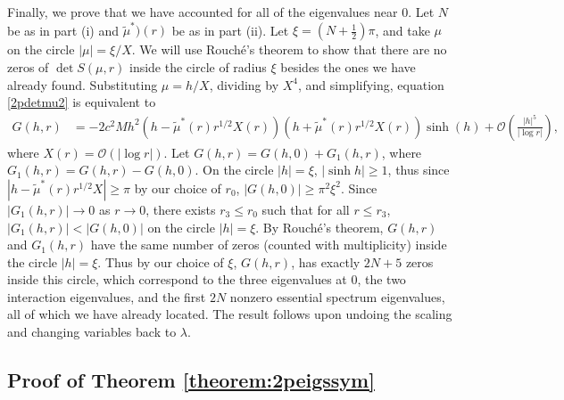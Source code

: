 \documentclass[10pt,reqno]{amsart}
\theoremstyle{plain}
\theoremstyle{definition}
\theoremstyle{remark}
\numberwithin{theorem}{section}
\numberwithin{equation}{section}
\begin{document}
Finally, we prove that we have accounted for all of the eigenvalues near 0. Let $N$ be as in part (i) and $\tilde{\mu}^*)(r)$ be as in part (ii). Let $\xi = \left( N + \frac{1}{2} \right) \pi$, and take $\mu$ on the circle $|\mu| = \xi/X$. We will use Rouch\'{e}'s theorem to show that there are no zeros of $\det S(\mu, r)$ inside the circle of radius $\xi$ besides the ones we have already found. Substituting $\mu = h/X$, dividing by $X^4$, and simplifying, equation \cref{2pdetmu2} is equivalent to 
\begin{equation}\label{Gcount3}
\begin{aligned}
G(h,r) &= -2 c^2 M h^2 \left( h - \tilde{\mu}^*(r)r^{1/2}X(r) \right)\left(h + \tilde{\mu}^*(r)r^{1/2}X(r) \right) \sinh(h) + \mathcal{O}\left(\frac{|h|^5}{|\log r| }\right),
\end{aligned}
\end{equation}
where $X(r) = \mathcal{O}(|\log r|)$. Let $G(h, r) = G(h, 0) + G_1(h, r)$, where $G_1(h, r) = G(h, r) - G(h, 0)$. On the circle $|h| = \xi$, $|\sinh h| \geq 1$, thus since $|h - \tilde{\mu}^*(r)r^{1/2}X|\geq \pi$ by our choice of $r_0$, $|G(h,0)| \geq \pi^2 \xi^2$. Since $|G_1(h,r)| \rightarrow 0$ as $r \rightarrow 0$, there exists $r_3 \leq r_0$ such that for all $r \leq r_3$, $|G_1(h,r)| < |G(h,0)|$ on the circle $|h| = \xi$. By Rouch\'{e}'s theorem, $G(h,r)$ and $G_1(h,r)$ have the same number of zeros (counted with multiplicity) inside the circle $|h| = \xi$. Thus by our choice of $\xi$, $G(h,r)$, has exactly $2N+ 5$ zeros inside this circle, which correspond to the three eigenvalues at 0, the two interaction eigenvalues, and the first $2 N$ nonzero essential spectrum eigenvalues, all of which we have already located. The result follows upon undoing the scaling and changing variables back to $\lambda$.

\subsection{Proof of Theorem \ref{theorem:2peigssym}}
\end{document}

